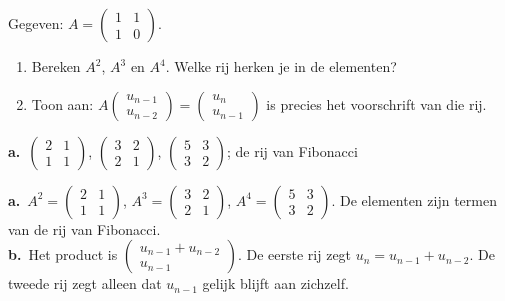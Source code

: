 \begin{oefeningen}
\begin{oefening}[2]
 Gegeven: $A = \begin{pmatrix} 1 & 1 \\ 1 & 0 \end{pmatrix}$.
\begin{enumerate}
  \item Bereken $A^2$, $A^3$ en $A^4$. Welke rij herken je in de elementen?
  \item Toon aan: $A \begin{pmatrix} u_{n-1} \\ u_{n-2} \end{pmatrix} = \begin{pmatrix} u_n \\ u_{n-1} \end{pmatrix}$ is precies het voorschrift van die rij.
\end{enumerate}
\begin{solution}
\textbf{a.}~$\begin{pmatrix} 2 & 1 \\ 1 & 1 \end{pmatrix}$, $\begin{pmatrix} 3 & 2 \\ 2 & 1 \end{pmatrix}$, $\begin{pmatrix} 5 & 3 \\ 3 & 2 \end{pmatrix}$; de rij van Fibonacci
\end{solution}
\begin{fullsolution}
\textbf{a.}~$A^2=\begin{pmatrix} 2 & 1 \\ 1 & 1 \end{pmatrix}$, $A^3=\begin{pmatrix} 3 & 2 \\ 2 & 1 \end{pmatrix}$, $A^4=\begin{pmatrix} 5 & 3 \\ 3 & 2 \end{pmatrix}$. De elementen zijn termen van de rij van Fibonacci.\\
\textbf{b.}~Het product is $\begin{pmatrix} u_{n-1}+u_{n-2} \\ u_{n-1} \end{pmatrix}$. De eerste rij zegt $u_n=u_{n-1}+u_{n-2}$. De tweede rij zegt alleen dat $u_{n-1}$ gelijk blijft aan zichzelf.
\end{fullsolution}
\end{oefening}


\end{oefeningen}
